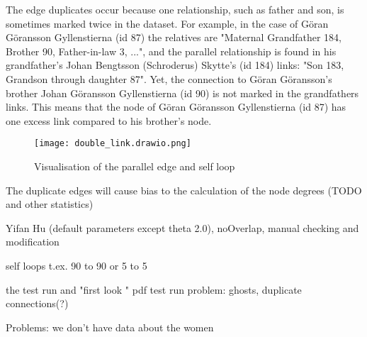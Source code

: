 \documentclass[a4paper,12pt]{article}
\begin{document}
The edge duplicates occur because one relationship, such as father and son, is sometimes marked twice in the dataset. For example, in the case of Göran Göransson Gyllenstierna (id 87) the relatives are "Maternal Grandfather 184, Brother 90, Father-in-law 3, ...", and the parallel relationship is found in his grandfather's Johan Bengtsson (Schroderus) Skytte's (id 184) links: "Son 183, Grandson through daughter 87". Yet, the connection to Göran Göransson's brother Johan Göransson Gyllenstierna (id 90) is not marked in the grandfathers links. This means that the node of Göran Göransson Gyllenstierna (id 87) has one excess link compared to his brother's node. 

\begin{figure}[h]
	\texttt{[image: double\_link.drawio.png]}
	\centering
	\caption{Visualisation of the parallel edge and self loop} 
	\centering
\end{figure}

The duplicate edges will cause bias to the calculation of the node degrees (TODO and other statistics)

Yifan Hu (default parameters except theta 2.0), noOverlap, manual checking and modification 

self loops t.ex. 90 to 90 or 5 to 5

the test run and "first look " pdf
test run problem: ghosts, duplicate connections(?)

Problems: we don't have data about the women
\end{document}
